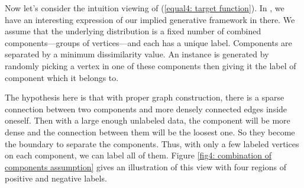 Now let's consider the intuition viewing of  (\ref{equal4: target function}). In \parencite{Blum:2001:LLU:645530.757779}, we have an interesting expression of our implied generative framework in there. We assume that the underlying distribution is a fixed number of combined components---groups of vertices---and each has a unique label. Components are separated by a minimum dissimilarity value. An instance is generated by randomly picking a vertex in one of these components then giving it the label of component which it belongs to. 

The hypothesis here is that with proper graph construction, there is a sparse connection between two components and more densely connected edges inside oneself. Then with a large enough unlabeled data, the component will be more dense and the connection between them will be the loosest one. So they become the boundary to separate the components. Thus, with only a few labeled vertices on each component, we can label all of them. Figure \ref{fig4: combination of components assumption} gives an illustration of this view with four regions of positive and negative labels.
